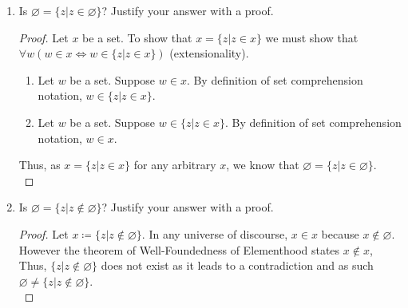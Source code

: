 \documentclass{article}
\newcommand{\Emptyset}{\varnothing}
\newcommand{\defeq}{\coloneqq}
\begin{document}
\begin{enumerate}
\begin{enumerate}
\begin{proof}
      \end{proof}
      \item
        Is $\Emptyset = \{z | z \in \Emptyset\}$? Justify your answer with a proof.
        \begin{proof}
        Let $x$ be a set. To show that $x = \{z | z \in x\}$ we must show that $\forall w(w \in x \iff w \in \{z | z \in x\})$ (extensionality).
        \begin{enumerate}
            \item Let $w$ be a set. Suppose $w \in x$. By definition of set comprehension notation, $w \in \{z | z \in x\}$.
            \item Let $w$ be a set. Suppose $w \in \{z | z \in x\}$. By definition of set comprehension notation, $w \in x$.
        \end{enumerate}
        Thus, as $x = \{z | z \in x\}$ for any arbitrary $x$, we know that $\Emptyset = \{z | z \in \Emptyset\}$.\\    
        \end{proof}
      \item
        Is $\Emptyset = \{z | z \notin \Emptyset\}$? Justify your answer with a proof.
        \begin{proof}
        Let $x \defeq \{z | z \notin \Emptyset\}$. In any universe of discourse, $x \in x$ because $x \notin \Emptyset$. However the theorem of Well-Foundedness of Elementhood states $x \notin x$, Thus, $\{z | z \notin \Emptyset\}$ does not exist as it leads to a contradiction and as such $\Emptyset \neq \{z | z \notin \Emptyset\}$.\\
        \end{proof}
    \end{enumerate}
\end{enumerate}
\end{document}
